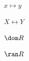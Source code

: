 \documentclass[a4paper,10pt,fleqn]{article}
\begin{document}
\noindent
$x \mapsto y$


\noindent
$X \rel Y$


\noindent
$\dom R$


\noindent
$\ran R$
\end{document}
